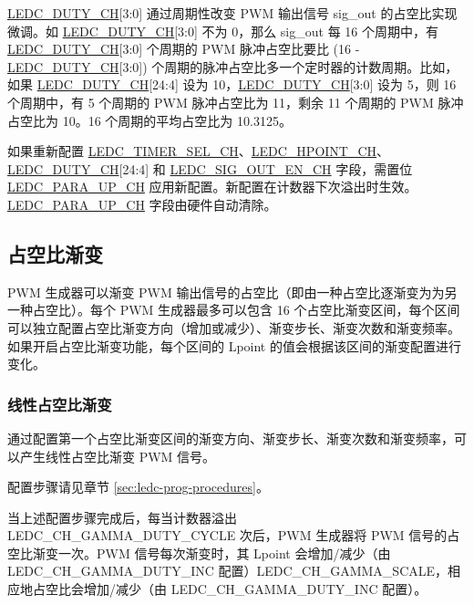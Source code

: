 \documentclass[main\_\_CN.tex]{subfiles}
\begin{document}
\hyperref[fielddesc:LEDCDUTYCHN]{LEDC\_DUTY\_CH}[3:0] 通过周期性改变 PWM 输出信号 sig\_out 的占空比实现微调。如 \hyperref[fielddesc:LEDCDUTYCHN]{LEDC\_DUTY\_CH}[3:0] 不为 0，那么 sig\_out 每 16 个周期中，有 \hyperref[fielddesc:LEDCDUTYCHN]{LEDC\_DUTY\_CH}[3:0] 个周期的 PWM 脉冲占空比要比 (16 - \hyperref[fielddesc:LEDCDUTYCHN]{LEDC\_DUTY\_CH}[3:0]) 个周期的脉冲占空比多一个定时器的计数周期。比如，如果 \hyperref[fielddesc:LEDCDUTYCHN]{LEDC\_DUTY\_CH}[24:4] 设为 10，\hyperref[fielddesc:LEDCDUTYCHN]{LEDC\_DUTY\_CH}[3:0] 设为 5，则 16 个周期中，有 5 个周期的 PWM 脉冲占空比为 11，剩余 11 个周期的 PWM 脉冲占空比为 10。16 个周期的平均占空比为 10.3125。

如果重新配置 \hyperref[fielddesc:LEDCTIMERSELCHN]{LEDC\_TIMER\_SEL\_CH}、\hyperref[fielddesc:LEDCHPOINTCHN]{LEDC\_HPOINT\_CH}、\hyperref[fielddesc:LEDCDUTYCHN]{LEDC\_DUTY\_CH}[24:4] 和 \hyperref[fielddesc:LEDCSIGOUTENCHN]{LEDC\_SIG\_OUT\_EN\_CH} 字段，需置位 \hyperref[fielddesc:LEDCPARAUPCHN]{LEDC\_PARA\_UP\_CH} 应用新配置。新配置在计数器下次溢出时生效。\hyperref[fielddesc:LEDCPARAUPCHN]{LEDC\_PARA\_UP\_CH} 字段由硬件自动清除。

\subsection{占空比渐变}

PWM 生成器可以渐变 PWM 输出信号的占空比（即由一种占空比逐渐变为为另一种占空比）。每个 PWM 生成器最多可以包含 16 个占空比渐变区间，每个区间可以独立配置占空比渐变方向（增加或减少）、渐变步长、渐变次数和渐变频率。如果开启占空比渐变功能，每个区间的 Lpoint 的值会根据该区间的渐变配置进行变化。

\subsubsection{线性占空比渐变}
\label{sec:ledc-pwm-linear-duty-cycle-fading}

通过配置第一个占空比渐变区间的渐变方向、渐变步长、渐变次数和渐变频率，可以产生线性占空比渐变 PWM 信号。

配置步骤请见章节 \ref{sec:ledc-prog-procedures}。

当上述配置步骤完成后，每当计数器溢出 LEDC\_CH\_GAMMA\_DUTY\_CYCLE 次后，PWM 生成器将 PWM 信号的占空比渐变一次。PWM 信号每次渐变时，其 Lpoint 会增加/减少（由 LEDC\_CH\_GAMMA\_DUTY\_INC 配置）LEDC\_CH\_GAMMA\_SCALE，相应地占空比会增加/减少（由 LEDC\_CH\_GAMMA\_DUTY\_INC 配置）。
\end{document}
